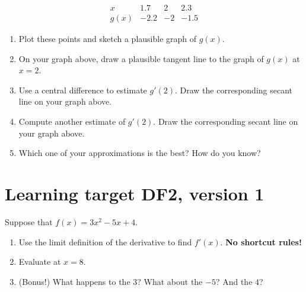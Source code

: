 \[
\begin{array}{c||r|r|r}
      x  &  1.7 &  2   &  2.3 \\\hline
    g(x) & -2.2 & -2   & -1.5
\end{array}
\]
\begin{enumerate}[leftmargin=0pt]

\item Plot these points and sketch a plausible graph of $g(x)$.


\item On your graph above, draw a plausible tangent line to the graph of $g(x)$ at $x=2$.

\item Use a central difference to estimate $g'(2)$. Draw the corresponding secant line on your graph above.

\vfill

\item Compute another estimate of $g'(2)$. Draw the corresponding secant line on your graph above.

\vfill

\item Which one of your approximations is the best? How do you know?

\vspace{1cm}

\end{enumerate}

\pagebreak

\section{Learning target DF2, version 1}

Suppose that $f(x) = 3x^2 - 5x + 4$.
\begin{enumerate}[leftmargin=0pt]
    \item Use the limit definition of the derivative to find $f'(x)$. \textbf{No shortcut rules!}
    
    \vfill
    \vfill

    \item Evaluate at $x=8$.

    \vfill
    \item (Bonus!) What happens to the 3? What about the $-5$? And the $4$?
\end{enumerate}


